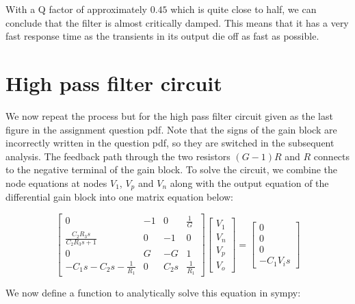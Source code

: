 \documentclass[11pt]{article}
\begin{document}
	
		
    With a Q factor of approximately \(0.45\) which is quite close to half,
we can conclude that the filter is almost critically damped. This means
that it has a very fast response time as the transients in its output
die off as fast as possible.

	

	
		
    \section{High pass filter circuit}\label{high-pass-filter-circuit}

We now repeat the process but for the high pass filter circuit given as
the last figure in the assignment question pdf. Note that the signs of
the gain block are incorrectly written in the question pdf, so they are
switched in the subsequent analysis. The feedback path through the two
resistors \((G-1)R\) and \(R\) connects to the negative terminal of the
gain block. To solve the circuit, we combine the node equations at nodes
\(V_1\), \(V_p\) and \(V_n\) along with the output equation of the
differential gain block into one matrix equation below:

	

	

    $$\left[\begin{matrix}0 & -1 & 0 & \frac{1}{G}\\\frac{C_{2} R_{3} s}{C_{2} R_{3} s + 1} & 0 & -1 & 0\\0 & G & - G & 1\\- C_{1} s - C_{2} s - \frac{1}{R_{1}} & 0 & C_{2} s & \frac{1}{R_{1}}\end{matrix}\right] \left[\begin{matrix}V_{1}\\V_{n}\\V_{p}\\V_{o}\end{matrix}\right] = \left[\begin{matrix}0\\0\\0\\- C_{1} V_{i} s\end{matrix}\right]$$

    
	
		
    We now define a function to analytically solve this equation in sympy:

	

	
		
\end{document}
